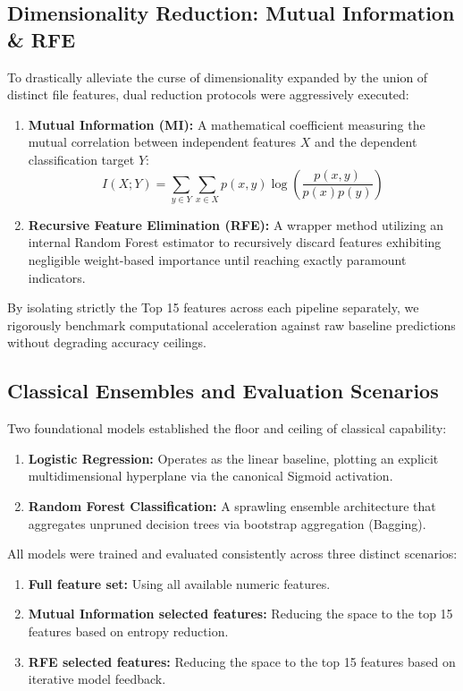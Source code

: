 \documentclass[12pt,a4paper]{article}
\begin{document}
\subsection{Dimensionality Reduction: Mutual Information \& RFE}
To drastically alleviate the curse of dimensionality expanded by the union of distinct file features, dual reduction protocols were aggressively executed:
\begin{enumerate}
    \item \textbf{Mutual Information (MI):} A mathematical coefficient measuring the mutual correlation between independent features $X$ and the dependent classification target $Y$:
    \begin{equation}
    I(X; Y) = \sum_{y \in Y} \sum_{x \in X} p(x,y) \log \left( \frac{p(x,y)}{p(x)p(y)} \right)
    \end{equation}
    \item \textbf{Recursive Feature Elimination (RFE):} A wrapper method utilizing an internal Random Forest estimator to recursively discard features exhibiting negligible weight-based importance until reaching exactly paramount indicators.
\end{enumerate}
By isolating strictly the Top 15 features across each pipeline separately, we rigorously benchmark computational acceleration against raw baseline predictions without degrading accuracy ceilings.

\subsection{Classical Ensembles and Evaluation Scenarios}
Two foundational models established the floor and ceiling of classical capability:
\begin{enumerate}
    \item \textbf{Logistic Regression:} Operates as the linear baseline, plotting an explicit multidimensional hyperplane via the canonical Sigmoid activation.
    \item \textbf{Random Forest Classification:} A sprawling ensemble architecture that aggregates unpruned decision trees via bootstrap aggregation (Bagging).
\end{enumerate}

All models were trained and evaluated consistently across three distinct scenarios:
\begin{enumerate}
    \item \textbf{Full feature set:} Using all available numeric features.
    \item \textbf{Mutual Information selected features:} Reducing the space to the top 15 features based on entropy reduction.
    \item \textbf{RFE selected features:} Reducing the space to the top 15 features based on iterative model feedback.
\end{enumerate}
\end{document}
